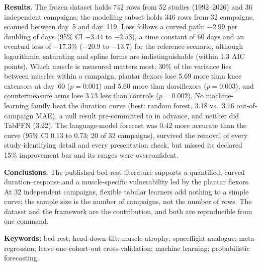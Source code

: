 \begin{small}
\noindent\textbf{\sffamily Results.} The frozen dataset holds 742 rows from 52 studies (1992--2026) and 36
independent campaigns; the modelling subset holds 346 rows from 32 campaigns, scanned between day~5 and day~119.
Loss follows a curved path: $-2.99$\pp{} per doubling of days (95\% CI $-3.44$ to $-2.53$), a time constant of 60
days and an eventual loss of $-17.3\%$ ($-20.9$ to $-13.7$) for the reference scenario, although logarithmic,
saturating and spline forms are indistinguishable (within 1.3 AIC points). Which muscle is measured matters most:
30\% of the variance lies between muscles within a campaign, plantar flexors lose 5.69\pp{} more than knee
extensors at day~60 ($p = 0.001$) and 5.60\pp{} more than dorsiflexors ($p = 0.003$), and countermeasure arms lose
3.73\pp{} less than controls ($p = 0.002$). No machine-learning family beat the duration curve (best: random forest,
3.18 vs.\ 3.16\pp{} out-of-campaign MAE), a null result pre-committed to in advance, and neither did TabPFN
(3.22\pp). The language-model forecast
was 0.42\pp{} more accurate than the curve (95\% CI 0.13 to 0.73; 20 of 32 campaigns), survived the removal of
every study-identifying detail and every presentation check, but missed its declared 15\% improvement bar and its
ranges were overconfident.

\noindent\textbf{\sffamily Conclusions.} The published bed-rest literature supports a quantified, curved
duration--response and a muscle-specific vulnerability led by the plantar flexors. At 32 independent campaigns,
flexible tabular learners add nothing to a simple curve; the sample size is the number of campaigns, not the
number of rows. The dataset and the framework are the contribution, and both are reproducible from one command.

\smallskip
\noindent\textbf{\sffamily Keywords:} bed rest; head-down tilt; muscle atrophy; spaceflight analogue;
meta-regression; leave-one-cohort-out cross-validation; machine learning; probabilistic forecasting.
\end{small}
